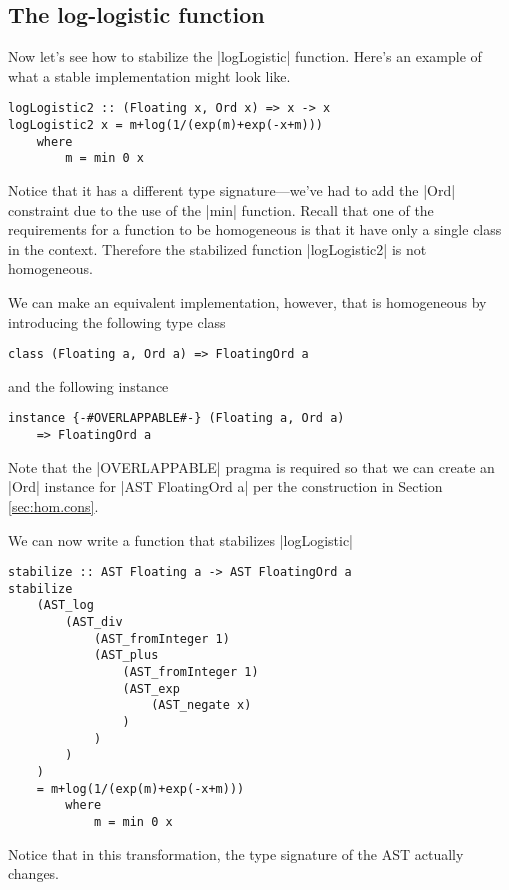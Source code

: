 \documentclass[preprint]{sigplanconf}
\theoremstyle{definition}
\begin{document}
\subsection{The log-logistic function}

Now let's see how to stabilize the |logLogistic| function.
Here's an example of what a stable implementation might look like.
\begin{lstlisting}
logLogistic2 :: (Floating x, Ord x) => x -> x
logLogistic2 x = m+log(1/(exp(m)+exp(-x+m)))
    where
        m = min 0 x
\end{lstlisting}
Notice that it has a different type signature---we've had to add the |Ord| constraint due to the use of the |min| function.
Recall that one of the requirements for a function to be homogeneous is that it have only a single class in the context.
Therefore the stabilized function |logLogistic2| is not homogeneous.

We can make an equivalent implementation, however, that is homogeneous by introducing the following type class
\begin{lstlisting}
class (Floating a, Ord a) => FloatingOrd a
\end{lstlisting}
and the following instance
\begin{lstlisting}
instance {-#OVERLAPPABLE#-} (Floating a, Ord a)
    => FloatingOrd a
\end{lstlisting}
Note that the |OVERLAPPABLE| pragma is required so that we can create an |Ord| instance for |AST FloatingOrd a| per the construction in Section \ref{sec:hom.cons}.

We can now write a function that stabilizes |logLogistic|
\begin{lstlisting}
stabilize :: AST Floating a -> AST FloatingOrd a
stabilize
    (AST_log
        (AST_div
            (AST_fromInteger 1)
            (AST_plus
                (AST_fromInteger 1)
                (AST_exp
                    (AST_negate x)
                )
            )
        )
    )
    = m+log(1/(exp(m)+exp(-x+m)))
        where
            m = min 0 x
\end{lstlisting}
Notice that in this transformation, the type signature of the AST actually changes.
\end{document}
